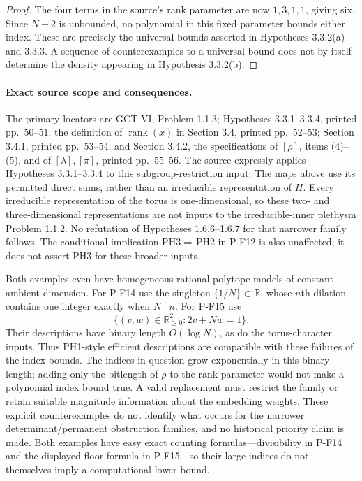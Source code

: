 \begin{proof}
The four terms in the source's rank parameter are now $1,3,1,1$,
giving six. Since $N-2$ is unbounded, no polynomial in this fixed
parameter bounds either index. These are precisely the universal
bounds asserted in Hypotheses 3.3.2(a) and 3.3.3. A sequence of
counterexamples to a universal bound does not by itself determine
the density appearing in Hypothesis 3.3.2(b).
\end{proof}

\paragraph{Exact source scope and consequences.}
The primary locators are GCT VI, Problem 1.1.3; Hypotheses 3.3.1--3.3.4,
printed pp.~50--51; the definition of $\operatorname{rank}(x)$ in
Section 3.4, printed pp.~52--53; Section 3.4.1, printed pp.~53--54;
and Section 3.4.2, the specifications of $[\rho]$, items (4)--(5),
and of $[\lambda],[\pi]$, printed pp.~55--56.
The source expressly applies Hypotheses 3.3.1--3.3.4 to this
subgroup-restriction input. The maps above use its permitted
direct sums, rather than an irreducible representation of $H$.
Every irreducible representation of the torus is one-dimensional,
so these two- and three-dimensional representations are not inputs
to the irreducible-inner plethysm Problem 1.1.2. No refutation of
Hypotheses 1.6.6--1.6.7 for that narrower family follows.
The conditional implication PH3$\Rightarrow$PH2 in P-F12 is also
unaffected; it does not assert PH3 for these broader inputs.

Both examples even have homogeneous rational-polytope models of
constant ambient dimension. For P-F14 use the singleton
$\{1/N\}\subset\mathbb R$, whose $n$th dilation contains one
integer exactly when $N\mid n$. For P-F15 use
\[
 \{(v,w)\in\mathbb R_{\ge0}^2:2v+Nw=1\}.
\]
Their descriptions have binary length $O(\log N)$, as do the
torus-character inputs. Thus PH1-style efficient descriptions are
compatible with these failures of the index bounds. The indices
in question grow exponentially in this binary length; adding only
the bitlength of $\rho$ to the rank parameter would not make a
polynomial index bound true. A valid replacement must restrict
the family or retain suitable magnitude information about the
embedding weights. These explicit counterexamples do not identify
what occurs for the narrower determinant/permanent obstruction
families, and no historical priority claim is made.
Both examples have easy exact counting formulas---divisibility in
P-F14 and the displayed floor formula in P-F15---so their large
indices do not themselves imply a computational lower bound.

